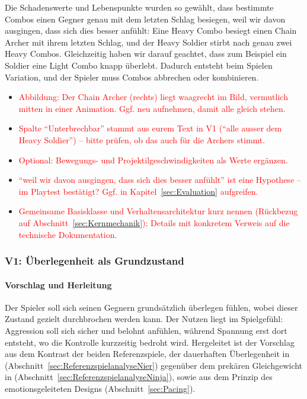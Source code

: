 \documentclass[../Main.tex]{subfiles}
\begin{document}
Die Schadenswerte und Lebenspunkte wurden so gewählt, dass bestimmte Combos einen Gegner genau mit dem letzten Schlag besiegen, weil wir davon ausgingen, dass sich dies besser anfühlt: Eine Heavy Combo besiegt einen Chain Archer mit ihrem letzten Schlag, und der Heavy Soldier stirbt nach genau zwei Heavy Combos. Gleichzeitig haben wir darauf geachtet, dass zum Beispiel ein Soldier eine Light Combo knapp überlebt. Dadurch entsteht beim Spielen Variation, und der Spieler muss Combos abbrechen oder kombinieren.

\begin{itemize}[leftmargin=1.5cm]
    \item \textcolor{red}{Abbildung: Der Chain Archer (rechts) liegt waagrecht im Bild, vermutlich mitten in einer Animation. Ggf. neu aufnehmen, damit alle gleich stehen.}
    \item \textcolor{red}{Spalte \enquote{Unterbrechbar} stammt aus eurem Text in V1 (\enquote{alle ausser dem Heavy Soldier}) -- bitte prüfen, ob das auch für die Archers stimmt.}
    \item \textcolor{red}{Optional: Bewegungs- und Projektilgeschwindigkeiten als Werte ergänzen.}
    \item \textcolor{red}{\enquote{weil wir davon ausgingen, dass sich dies besser anfühlt} ist eine Hypothese -- im Playtest bestätigt? Ggf. in Kapitel~\ref{sec:Evaluation} aufgreifen.}
    \item \textcolor{red}{Gemeinsame Basisklasse und Verhaltensarchitektur kurz nennen (Rückbezug auf Abschnitt~\ref{sec:Kernmechanik}); Details mit konkretem Verweis auf die technische Dokumentation.}
\end{itemize}

\subsubsection{V1: Überlegenheit als Grundzustand} \label{sec:V1}

\paragraph{Vorschlag und Herleitung}
Der Spieler soll sich seinen Gegnern grundsätzlich überlegen fühlen, wobei dieser Zustand gezielt durchbrochen werden kann. Der Nutzen liegt im Spielgefühl: Aggression soll sich sicher und belohnt anfühlen, während Spannung erst dort entsteht, wo die Kontrolle kurzzeitig bedroht wird. Hergeleitet ist der Vorschlag aus dem Kontrast der beiden Referenzspiele, der dauerhaften Überlegenheit in  (Abschnitt~\ref{sec:ReferenzspielanalyseNier}) gegenüber dem prekären Gleichgewicht in  (Abschnitt~\ref{sec:ReferenzspielanalyseNinja}), sowie aus dem Prinzip des emotionsgeleiteten Designs (Abschnitt~\ref{sec:Pacing}).
\end{document}
